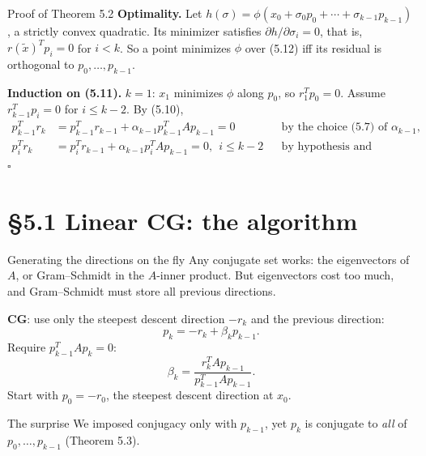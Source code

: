\documentclass[12pt,aspectratio=169]{beamer}
\begin{document}
\begin{frame}{Proof of Theorem 5.2}
  \textbf{Optimality.} Let $h(\sigma)=\phi(x_0+\sigma_0p_0+\cdots+\sigma_{k-1}p_{k-1})$, a strictly convex quadratic.
  Its minimizer satisfies $\partial h/\partial\sigma_i=0$, that is, $r(\tilde x)^Tp_i=0$ for $i<k$.
  So a point minimizes $\phi$ over (5.12) iff its residual is orthogonal to $p_0,\dots,p_{k-1}$.

  \vspace{1ex}
  \textbf{Induction on (5.11).} $k=1$: $x_1$ minimizes $\phi$ along $p_0$, so $r_1^Tp_0=0$.
  Assume $r_{k-1}^Tp_i=0$ for $i\le k-2$. By (5.10),
  \begin{align*}
    p_{k-1}^Tr_k &= p_{k-1}^Tr_{k-1}+\alpha_{k-1}p_{k-1}^TAp_{k-1} = 0 &&\text{by the choice (5.7) of } \alpha_{k-1},\\
    p_i^Tr_k &= p_i^Tr_{k-1}+\alpha_{k-1}p_i^TAp_{k-1} = 0, \ \ i\le k-2 &&\text{by hypothesis and conjugacy.}
  \end{align*}
  \hfill$\square$
\end{frame}

\section{\S5.1 Linear CG: the algorithm}

\begin{frame}{Generating the directions on the fly}
  Any conjugate set works: the eigenvectors of $A$, or Gram--Schmidt in the $A$-inner product.
  But eigenvectors cost too much, and Gram--Schmidt must store all previous directions.

  \textbf{CG}: use only the steepest descent direction $-r_k$ and the previous direction:
  \begin{equation}
    p_k = -r_k+\beta_kp_{k-1}. \tag{5.13}
  \end{equation}
  Require $p_{k-1}^TAp_k=0$:
  \[
    \beta_k = \frac{r_k^TAp_{k-1}}{p_{k-1}^TAp_{k-1}}.
  \]
  Start with $p_0=-r_0$, the steepest descent direction at $x_0$.
  \begin{block}{The surprise}
    We imposed conjugacy only with $p_{k-1}$, yet $p_k$ is conjugate to \emph{all} of $p_0,\dots,p_{k-1}$ (Theorem 5.3).
  \end{block}
\end{frame}
\end{document}
